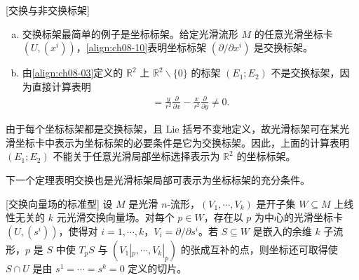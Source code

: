 \documentclass[../../main.tex]{subfiles}
\begin{document}
\begin{example}\label{example:ch09-45}[交换与非交换标架]
\begin{enumerate}[(a)]
\item 交换标架最简单的例子是坐标标架。给定光滑流形 $M$ 的任意光滑坐标卡 $(U,(x^i))$，\eqref{align:ch08-10}表明坐标标架 $(\partial/\partial x^i)$ 是交换标架。

\item 由\eqref{align:ch08-03}定义的 $\mathbb{R}^2$ 上 $\mathbb{R}^2\smallsetminus\{0\}$ 的标架 $(E_1;E_2)$ 不是交换标架，因为直接计算表明
\begin{align*}
[E_1;E_2]=\frac{y}{r^2}\frac{\partial}{\partial x}-\frac{x}{r^2}\frac{\partial}{\partial y}\neq 0.
\end{align*}
\end{enumerate}
\end{example}

由于每个坐标标架都是交换标架，且 Lie 括号不变地定义，故光滑标架可在某光滑坐标卡中表示为坐标标架的必要条件是它为交换标架。因此，上面的计算表明 $(E_1;E_2)$ 不能关于任意光滑局部坐标选择表示为 $\mathbb{R}^2$ 的坐标标架。

下一个定理表明交换也是光滑标架局部可表示为坐标标架的充分条件。

\begin{theorem}\label{theorem:ch09-46}[交换向量场的标准型]
设 $M$ 是光滑 $n$-流形，$(V_1,\cdots ,V_k)$ 是开子集 $W\subseteq M$ 上线性无关的 $k$ 元光滑交换向量场。对每个 $p\in W$，存在以 $p$ 为中心的光滑坐标卡 $(U,(s^i))$，使得对 $i=1,\cdots ,k$，$V_i=\partial/\partial s^i$。若 $S\subseteq W$ 是嵌入的余维 $k$ 子流形，$p$ 是 $S$ 中使 $T_pS$ 与 $(V_1|_p,\cdots ,V_k|_p)$ 的张成互补的点，则坐标还可取得使 $S\cap U$ 是由 $s^1=\cdots=s^k=0$ 定义的切片。
\end{theorem}
\end{document}
